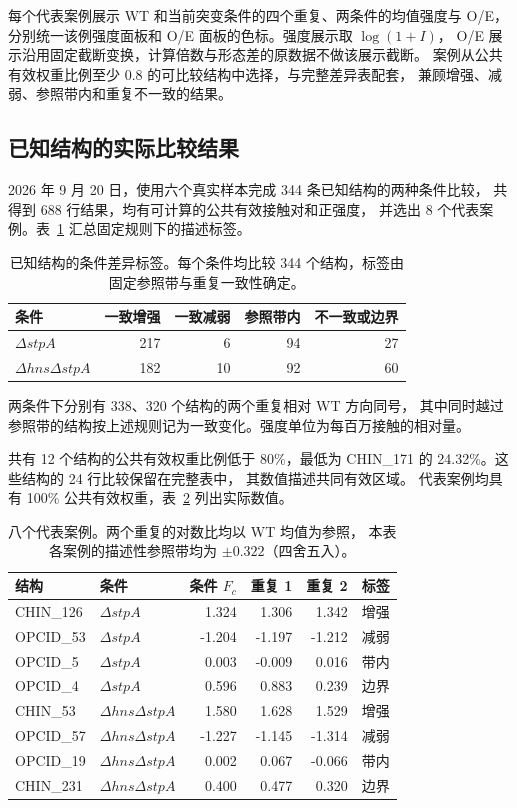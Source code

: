每个代表案例展示 WT 和当前突变条件的四个重复、两条件的均值强度与 O/E，
分别统一该例强度面板和 O/E 面板的色标。强度展示取 $\log(1+I)$，
O/E 展示沿用固定截断变换，计算倍数与形态差的原数据不做该展示截断。
案例从公共有效权重比例至少 0.8 的可比较结构中选择，与完整差异表配套，
兼顾增强、减弱、参照带内和重复不一致的结果。

\subsection{已知结构的实际比较结果}
2026 年 9 月 20 日，使用六个真实样本完成 344 条已知结构的两种条件比较，
共得到 688 行结果，均有可计算的公共有效接触对和正强度，
并选出 8 个代表案例。表~\ref{tab:condition-differences} 汇总固定规则下的描述标签。

\begin{table}[htbp]
\centering
\caption{已知结构的条件差异标签。每个条件均比较 344 个结构，标签由固定参照带与重复一致性确定。}
\label{tab:condition-differences}
\begin{tabular}{lrrrr}
\toprule
条件 & 一致增强 & 一致减弱 & 参照带内 & 不一致或边界 \\
\midrule
$\Delta stpA$ & 217 & 6 & 94 & 27 \\
$\Delta hns\Delta stpA$ & 182 & 10 & 92 & 60 \\
\bottomrule
\end{tabular}
\end{table}

两条件下分别有 338、320 个结构的两个重复相对 WT 方向同号，
其中同时越过参照带的结构按上述规则记为一致变化。强度单位为每百万接触的相对量。

共有 12 个结构的公共有效权重比例低于 80\%，最低为
CHIN\_171 的 24.32\%。这些结构的 24 行比较保留在完整表中，
其数值描述共同有效区域。
代表案例均具有 100\% 公共有效权重，表~\ref{tab:difference-cases} 列出实际数值。

\begin{table}[htbp]
\centering
\small
\caption{八个代表案例。两个重复的对数比均以 WT 均值为参照，
本表各案例的描述性参照带均为 $\pm0.322$（四舍五入）。}
\label{tab:difference-cases}
\begin{tabular}{llrrrl}
\toprule
结构 & 条件 & 条件 $F_c$ & 重复 1 & 重复 2 & 标签 \\
\midrule
CHIN\_126 & $\Delta stpA$ & 1.324 & 1.306 & 1.342 & 增强 \\
OPCID\_53 & $\Delta stpA$ & -1.204 & -1.197 & -1.212 & 减弱 \\
OPCID\_5 & $\Delta stpA$ & 0.003 & -0.009 & 0.016 & 带内 \\
OPCID\_4 & $\Delta stpA$ & 0.596 & 0.883 & 0.239 & 边界 \\
CHIN\_53 & $\Delta hns\Delta stpA$ & 1.580 & 1.628 & 1.529 & 增强 \\
OPCID\_57 & $\Delta hns\Delta stpA$ & -1.227 & -1.145 & -1.314 & 减弱 \\
OPCID\_19 & $\Delta hns\Delta stpA$ & 0.002 & 0.067 & -0.066 & 带内 \\
CHIN\_231 & $\Delta hns\Delta stpA$ & 0.400 & 0.477 & 0.320 & 边界 \\
\bottomrule
\end{tabular}
\end{table}

